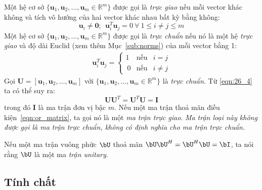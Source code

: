 Một hệ cơ sở $\{\mathbf{u}_1, \mathbf{u}_2,\dots, \mathbf{u}_m \in
\mathbb{R}^m\}$ được gọi là \textit{trực giao} nếu mỗi vector khác không và tích
vô hướng của hai vector khác nhau bất kỳ bằng không:
\begin{equation}
\mathbf{u}_i \neq \mathbf{0}; ~~ \mathbf{u}_i^T \mathbf{u}_j = 0
                ~ \forall ~1 \leq i \neq j \leq m
\end{equation}
Một hệ cơ sở $\{\mathbf{u}_1, \mathbf{u}_2,\dots, \mathbf{u}_m \in
\mathbb{R}^m\}$ được gọi là \textit{trực chuẩn} nếu nó là một hệ \textit{trực
giao} và độ dài Euclid (xem thêm Mục~\ref{sub:norms}) của mỗi vector bằng 1:
\begin{eqnarray}
\label{eqn:26_4}
\mathbf{u}_i^T \mathbf{u}_j = \left\{
\begin{matrix}
    1 & \text{nếu} &i = j \\\
    0 & \text{nếu} &i \neq j 
\end{matrix}
\right.
\end{eqnarray}
Gọi $\mathbf{U} = [\mathbf{u}_1, \mathbf{u}_2,\dots, \mathbf{u}_m]$ với
$\{\mathbf{u}_1, \mathbf{u}_2,\dots, \mathbf{u}_m \in \mathbb{R}^m\}$ là
\textit{trực chuẩn}. Từ \eqref{eqn:26_4} ta có thể suy ra:
\begin{equation}
\label{eqn:or_matrix}
\mathbf{UU}^T = \mathbf{U}^T\mathbf{U} = \mathbf{I}
\end{equation}
trong đó $\mathbf{I}$ là ma trận đơn vị bậc $m$. Nếu một ma trận thoả mãn điều
kiện~\eqref{eqn:or_matrix}, ta gọi nó là một \textit{ma trận trực giao}.
\textit{Ma trận loại này không được gọi là ma trận trực chuẩn, không có định
nghĩa cho ma trận trực chuẩn.}


Nếu một ma trận vuông phức $\bU$ thoả mãn $\bU\bU^H = \bU^H\bU = \bI$, ta nói
rằng $\bU$ là một ma \textit{trận unitary}.

\subsection{Tính chất} %

